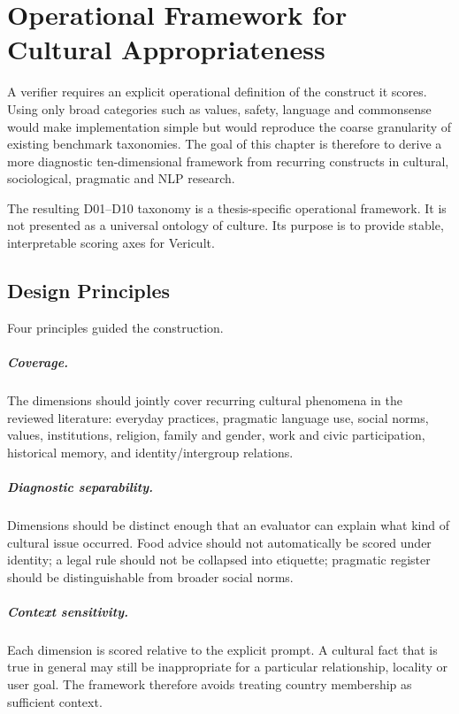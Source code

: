 \chapter{Operational Framework for Cultural Appropriateness}
\label{ch:framework}

A verifier requires an explicit operational definition of the construct it scores. Using only broad categories such as values, safety, language and commonsense would make implementation simple but would reproduce the coarse granularity of existing benchmark taxonomies. The goal of this chapter is therefore to derive a more diagnostic ten-dimensional framework from recurring constructs in cultural, sociological, pragmatic and NLP research.

The resulting D01--D10 taxonomy is a thesis-specific operational framework. It is not presented as a universal ontology of culture. Its purpose is to provide stable, interpretable scoring axes for Vericult.

\section{Design Principles}

Four principles guided the construction.

\paragraph{Coverage.}
The dimensions should jointly cover recurring cultural phenomena in the reviewed literature: everyday practices, pragmatic language use, social norms, values, institutions, religion, family and gender, work and civic participation, historical memory, and identity/intergroup relations.

\paragraph{Diagnostic separability.}
Dimensions should be distinct enough that an evaluator can explain what kind of cultural issue occurred. Food advice should not automatically be scored under identity; a legal rule should not be collapsed into etiquette; pragmatic register should be distinguishable from broader social norms.

\paragraph{Context sensitivity.}
Each dimension is scored relative to the explicit prompt. A cultural fact that is true in general may still be inappropriate for a particular relationship, locality or user goal. The framework therefore avoids treating country membership as sufficient context.

